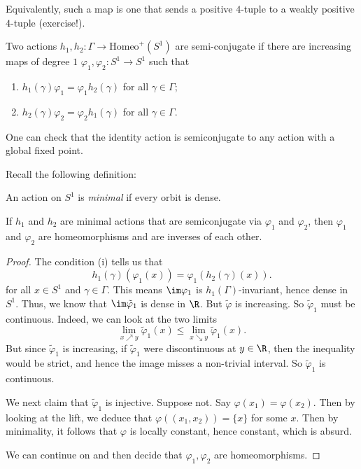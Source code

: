 \documentclass[a4paper]{article}
\newcommand\Homeo{\mathrm{Homeo}}
\begin{document}
Equivalently, such a map is one that sends a positive $4$-tuple to a weakly positive $4$-tuple (exercise!). %

\begin{defi}
  Two actions $h_1, h_2: \Gamma \to \Homeo^+(S^1)$ are semi-conjugate if there are increasing maps of degree $1$ $\varphi_1, \varphi_2: S^1 \to S^1$ such that
  \begin{enumerate}
    \item $h_1(\gamma) \varphi_1 = \varphi_1 h_2(\gamma)$ for all $\gamma \in \Gamma$;
    \item $h_2(\gamma) \varphi_2 = \varphi_2 h_1(\gamma)$ for all $\gamma \in \Gamma$.
  \end{enumerate}
\end{defi}
One can check that the identity action is semiconjugate to any action with a global fixed point.

Recall the following definition:
\begin{defi}
  An action on $S^1$ is \emph{minimal} if every orbit is dense.
\end{defi}

\begin{lemma}
  If $h_1$ and $h_2$ are minimal actions that are semiconjugate via $\varphi_1$ and $\varphi_2$, then $\varphi_1$ and $\varphi_2$ are homeomorphisms and are inverses of each other.
\end{lemma}

\begin{proof}
  The condition (i) tells us that
  \[
    h_1(\gamma) (\varphi_1(x)) = \varphi_1(h_2(\gamma)(x)).
  \]
  for all $x \in S^1$ and $\gamma \in \Gamma$. This means $\im \varphi_1$ is $h_1(\Gamma)$-invariant, hence dense in $S^1$. Thus, we know that $\im \tilde{\varphi}_1$ is dense in $\R$. But $\tilde{\varphi}$ is increasing. So $\tilde{\varphi}_1$ must be continuous. Indeed, we can look at the two limits
  \[
    \lim_{x \nearrow y} \tilde{\varphi}_1(x) \leq \lim_{x \searrow y} \tilde{\varphi}_1(x).
  \]
  But since $\tilde{\varphi}_1$ is increasing, if $\tilde{\varphi}_1$ were discontinuous at $y \in \R$, then the inequality would be strict, and hence the image misses a non-trivial interval. So $\tilde{\varphi}_1$ is continuous.

  We next claim that $\tilde{\varphi}_1$ is injective. Suppose not. Say $\varphi(x_1) = \varphi(x_2)$. Then by looking at the lift, we deduce that $\varphi((x_1, x_2)) = \{x\}$ for some $x$. Then by minimality, it follows that $\varphi$ is locally constant, hence constant, which is absurd.

  We can continue on and then decide that $\varphi_1, \varphi_2$ are homeomorphisms. %
\end{proof}
\end{document}
